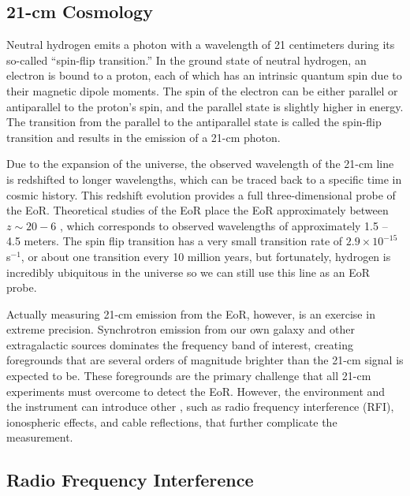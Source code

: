 \documentclass[12pt]{article}
\begin{document}
\subsection{21-cm Cosmology} \label{subsec:21cm}

Neutral hydrogen emits a photon with a wavelength of 21 centimeters during its so-called ``spin-flip transition.'' In the ground state of neutral hydrogen, an electron is bound to a proton, each of which has an intrinsic quantum spin due to their magnetic dipole moments. The spin of the electron can be either parallel or antiparallel to the proton's spin, and the parallel state is slightly higher in energy. The transition from the parallel to the antiparallel state is called the spin-flip transition and results in the emission of a 21-cm photon. 

Due to the expansion of the universe, the observed wavelength of the 21-cm line is redshifted to longer wavelengths, which can be traced back to a specific time in cosmic history. This redshift evolution provides a full three-dimensional probe of the EoR. Theoretical studies of the EoR place the EoR approximately between $z \sim 20 - 6$ , which corresponds to observed wavelengths of approximately 1.5 -- 4.5 meters. The spin flip transition has a very small transition rate of $2.9 \times 10^{-15}$ s$^{-1}$, or about one transition every 10 million years, but fortunately, hydrogen is incredibly ubiquitous in the universe so we can still use this line as an EoR probe.

Actually measuring 21-cm emission from the EoR, however, is an exercise in extreme precision. Synchrotron emission from our own galaxy and other extragalactic sources dominates the frequency band of interest, creating foregrounds that are several orders of magnitude brighter than the 21-cm signal is expected to be. These foregrounds are the primary challenge that all 21-cm experiments must overcome to detect the EoR. However, the environment and the instrument can introduce other , such as radio frequency interference (RFI), ionospheric effects, and cable reflections, that further complicate the measurement.

\subsection{Radio Frequency Interference} \label{subsec:rfi}
\end{document}
